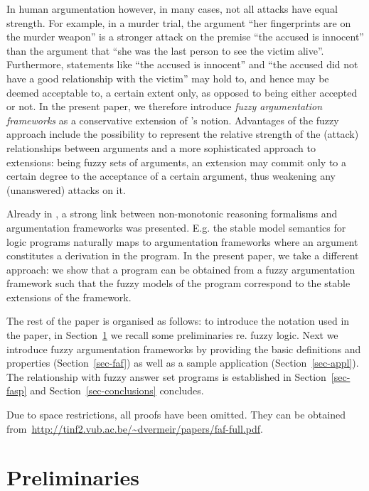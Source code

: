 \documentclass[12pt,a4paper]{article}
\begin{document}
In human argumentation however, in many cases, not all attacks have equal strength.
For example, in a murder trial, the argument ``her fingerprints are on
the murder weapon'' is a stronger attack on the premise ``the accused is
innocent'' than the argument that ``she was the last person to see the
victim alive''. Furthermore, statements like ``the accused is innocent'' and ``the accused did not have a good relationship with the victim'' may hold to, and hence may be deemed acceptable to, a certain extent only, as opposed to being either accepted or not.
In the present paper, we therefore introduce \emph{fuzzy argumentation
frameworks} as a conservative extension of \cite{dung95}'s notion.
Advantages of the fuzzy approach include the possibility to
represent the relative strength of the (attack) relationships
between arguments and a more sophisticated approach to
extensions: being fuzzy sets of arguments, an extension may
commit only to a certain degree to the acceptance of a certain
argument, thus weakening any (unanswered) attacks on it. 

Already in \cite{dung95}, a strong link between non-monotonic
reasoning formalisms and argumentation frameworks was presented. E.g.
the stable model semantics for logic programs naturally maps to
argumentation frameworks where an argument constitutes a derivation in
the program. In the present paper, we take a different approach: we
show that a program can be obtained from a fuzzy argumentation framework such that the
fuzzy models of the program correspond to the stable extensions
of the framework.

The rest of the paper is organised as follows: to introduce the notation used in the paper, in Section~\ref{sec-prelim} we recall some preliminaries re. fuzzy logic. Next we introduce fuzzy argumentation frameworks by providing the basic definitions and properties (Section~\ref{sec-faf}) as well as a sample application (Section~\ref{sec-appl}). The relationship with fuzzy answer set programs is
established in Section~\ref{sec-fasp} and Section~\ref{sec-conclusions} concludes.

Due to space restrictions, all proofs have been omitted. They can be
obtained from~\url{http://tinf2.vub.ac.be/~dvermeir/papers/faf-full.pdf}.


%
%

\section{Preliminaries}\label{sec-prelim}
\end{document}
